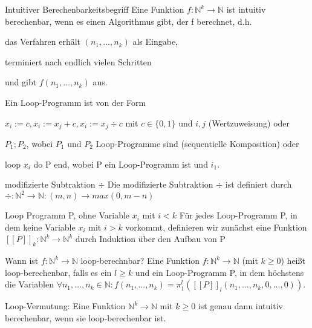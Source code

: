 \documentclass[avery5371, frame]{flashcards}
\begin{document}
\begin{flashcard}[Definition]{ Intuitiver Berechenbarkeitsbegriff}
    Eine Funktion $f:\mathbb{N}^k\rightarrow\mathbb{N}$ ist intuitiv berechenbar, wenn es einen Algorithmus gibt, der f berechnet, d.h.
    \begin{itemize*}
        \item das Verfahren erhält $(n_1,..., n_k)$ als Eingabe,
        \item terminiert nach endlich vielen Schritten
        \item und gibt $f(n_1,...,n_k )$ aus.
    \end{itemize*}
\end{flashcard}

\begin{flashcard}[Definition]{ Ein Loop-Programm ist von der Form}
    \begin{itemize*}
        \item $x_i := c, x_i := x_j + c, x_i := x_j \div c$ mit $c\in\{0, 1\}$ und $i, j$ (Wertzuweisung) oder
        \item $P_1 ; P_2$, wobei $P_1$ und $P_2$ Loop-Programme sind (sequentielle Komposition) oder
        \item loop $x_i$ do P end, wobei P ein Loop-Programm ist und $i_1$.
    \end{itemize*}
\end{flashcard}

\begin{flashcard}[Definition]{modifizierte Subtraktion $\div$}
    Die modifizierte Subtraktion $\div$ ist definiert durch $\div: \mathbb{N}^2 \rightarrow \mathbb{N}: (m,n)\rightarrow max(0,m-n)$
\end{flashcard}

\begin{flashcard}[Definition]{Loop Programm P, ohne Variable $x_i$ mit $i<k$}
    Für jedes Loop-Programm P, in dem keine Variable $x_i$ mit $i>k$ vorkommt, definieren wir zunächst eine Funktion $[[P]]_k:\mathbb{N}^k\rightarrow \mathbb{N}^k$ durch Induktion über den Aufbau von P
\end{flashcard}

\begin{flashcard}[Definition]{Wann ist  $f:\mathbb{N}^k\rightarrow\mathbb{N}$ loop-berechnbar?}
    Eine Funktion $f:\mathbb{N}^k\rightarrow\mathbb{N}$ (mit $k\geq 0$) heißt loop-berechenbar, falls es ein $l\geq k$ und ein Loop-Programm P, in dem höchstens die Variablen $\forall n_1,...,n_k\in\mathbb{N}:f(n_1,...,n_k)=\pi_1^l([[P]]_l(n_1,...,n_k,0,...,0))$.

    Loop-Vermutung: Eine Funktion $\mathbb{N}^k\rightarrow \mathbb{N}$ mit $k \geq 0$ ist genau dann intuitiv berechenbar, wenn sie loop-berechenbar ist.
\end{flashcard}
\end{document}
